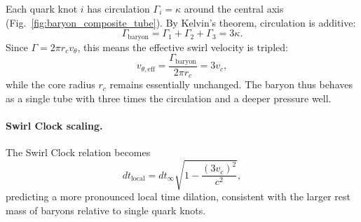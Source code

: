 \documentclass[reprint,aps,onecolumn,nofootinbib]{revtex4-2}
\begin{document}
    Each quark knot $i$ has circulation $\Gamma_i = \kappa$ around the central axis (Fig.~\ref{fig:baryon_composite_tube}).
    By Kelvin's theorem, circulation is additive:
    \begin{equation}
    \Gamma_{\mathrm{baryon}} = \Gamma_1 + \Gamma_2 + \Gamma_3
    = 3 \kappa.
    \end{equation}
    Since $\Gamma = 2\pi r_c v_\theta$, this means the effective swirl velocity is tripled:
    \begin{equation}
    v_{\theta,\mathrm{eff}} = \frac{\Gamma_{\mathrm{baryon}}}{2\pi r_c} = 3 v_c,
    \end{equation}
    while the core radius $r_c$ remains essentially unchanged.
    The baryon thus behaves as a single tube with three times the circulation and a deeper pressure well.

    \paragraph{Swirl Clock scaling.}
        The Swirl Clock relation becomes
        \begin{equation}
        dt_{\mathrm{local}} = dt_\infty \sqrt{1 - \frac{(3 v_c)^2}{c^2}},
        \end{equation}
        predicting a more pronounced local time dilation, consistent with the larger rest mass of baryons relative to single quark knots.
\end{document}
